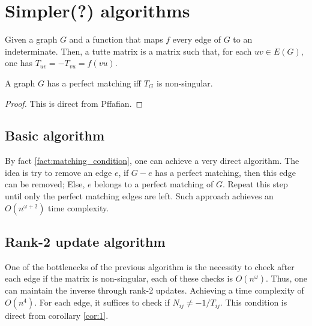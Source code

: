 \chapter{Simpler(?) algorithms}

\begin{definition}[Indeterminates]

\end{definition}

\begin{definition}
    Given a graph \(G\) and a function that maps \(f\) every edge of \(G\) to an indeterminate.
    Then, a tutte matrix is a matrix such that, for each \(uv \in E(G)\), one has \(T_{uv} = -T_{vu} = f(vu)\).
\end{definition}

\begin{fact}
    \label{fact:matching_condition}
    A graph \(G\) has a perfect matching iff \(T_G\) is non-singular.
\end{fact}

\begin{proof}
    This is direct from Pffafian.
\end{proof}

\section{Basic algorithm}

By fact \ref{fact:matching_condition}, one can achieve a very direct algorithm.
The idea is try to remove an edge \(e\), if \(G - e\) has a perfect matching, 
then this edge can be removed; Else, \(e\) belongs to a perfect matching of \(G\).
Repeat this step until only the perfect matching edges are left.
Such approach achieves an \(O(n^{\omega + 2})\) time complexity.

\section{Rank-2 update algorithm}

One of the bottlenecks of the previous algorithm is the necessity to check after each
edge if the matrix is non-singular, each of these checks is \(O(n^{\omega})\).
Thus, one can maintain the inverse through rank-2 updates.
Achieving a time complexity of \(O(n^{4})\).
For each edge, it suffices to check if \(N_{ij} \neq -1/T_{ij}\).
This condition is direct from corollary \ref{cor:1}.

